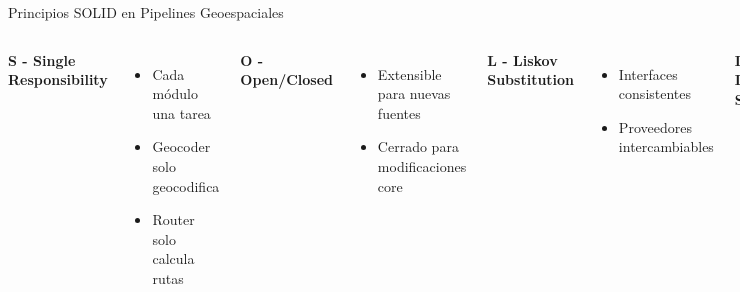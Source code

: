 \documentclass[10pt,aspectratio=169]{beamer}
\newcommand{\alertbox}[1]{
\begin{tcolorbox}[colframe=red!70,colback=red!5]
\centering\faExclamationTriangle\space #1
\end{tcolorbox}
}
\begin{document}
\begin{frame}{Principios SOLID en Pipelines Geoespaciales}
    \begin{columns}[T]
        \textbf{S - Single Responsibility}
        \begin{itemize}
            \item Cada módulo una tarea
            \item Geocoder solo geocodifica
            \item Router solo calcula rutas
        \end{itemize}
        
        \textbf{O - Open/Closed}
        \begin{itemize}
            \item Extensible para nuevas fuentes
            \item Cerrado para modificaciones core
        \end{itemize}
        
        \textbf{L - Liskov Substitution}
        \begin{itemize}
            \item Interfaces consistentes
            \item Proveedores intercambiables
        \end{itemize}
        
        \textbf{I - Interface Segregation}
        \begin{itemize}
            \item APIs específicas por dominio
            \item No forzar dependencias innecesarias
        \end{itemize}
        
        \textbf{D - Dependency Inversion}
        \begin{itemize}
            \item Depender de abstracciones
            \item Inyección de dependencias
            \item Configuración externa
        \end{itemize}
        
        \vspace{0.3cm}
        \alertbox{Aplicar SOLID reduce acoplamiento y mejora mantenibilidad}
    \end{columns}
\end{frame}
\end{document}
